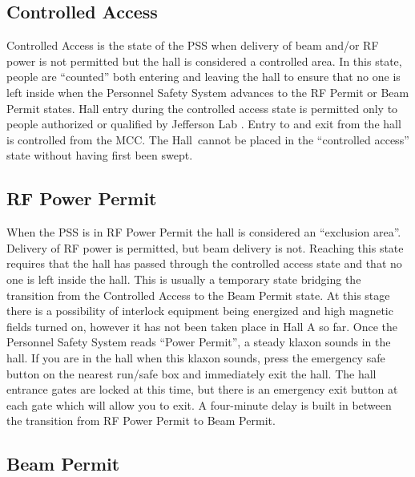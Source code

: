 \begin{safetyen}{10}{10}
\subsection{Controlled Access}
\end{safetyen}

 Controlled Access is the state of the PSS when delivery of beam
and/or RF power is not permitted but the hall is considered a
controlled area.  In this state, people are ``counted'' both entering
and leaving the hall to ensure that no one is left inside when the
Personnel Safety System advances to the RF Permit or Beam Permit
states.  Hall entry during the controlled access state is permitted
only to people authorized or qualified by Jefferson Lab .  Entry to
and exit from the hall is controlled from the MCC.  The Hall~cannot be
placed in the ``controlled access'' state without having first been
swept.

\begin{safetyen}{10}{10}
\subsection{RF Power Permit} 
\end{safetyen}

When the PSS is in RF Power Permit the hall is considered an
``exclusion area''.  Delivery of RF power is permitted, but beam
delivery is not.  Reaching this state requires that the hall has
passed through the controlled access state and that no one is left
inside the hall. This is usually a temporary state bridging the
transition from the Controlled Access to the Beam Permit state. 
At this stage there is a possibility of interlock equipment being energized
and high magnetic fields turned on, however it has not been
taken place in Hall A so far.
Once the Personnel Safety System reads ``Power Permit'', a steady klaxon
sounds in the hall. If you are in the hall when this klaxon sounds,
press the emergency safe button on the nearest run/safe box and
immediately exit the hall. The hall entrance gates are locked at this
time, but there is an emergency exit button at each gate which will
allow you to exit. A four-minute delay is built in between the
transition from RF Power Permit to Beam Permit.
 
\begin{safetyen}{10}{10}
\subsection{Beam Permit}
\end{safetyen}

